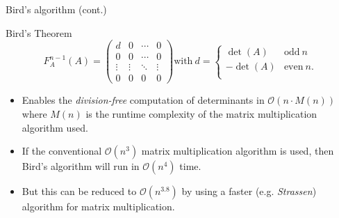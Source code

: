 \documentclass[handout]{beamer}
\begin{document}
\begin{frame}{Bird's algorithm (cont.)}

    \begin{block}{Bird's Theorem}
        \[
            F_A^{n-1}(A) =
            \begin{pmatrix}{}
                d      & 0      & \cdots & 0 \\
                0      & 0      & \cdots & 0 \\
                \vdots & \vdots & \ddots & \vdots \\
                0      & 0      & 0      & 0
            \end{pmatrix}
            \text{with} \ d =
            \begin{cases}{}
                \det(A)  & \text{odd} \ n \\
                -\det(A) & \text{even} \ n. \\
            \end{cases}
        \]
    \end{block}

    \pause{}

    \begin{itemize}

        \item Enables the \emph{division-free} computation of determinants in
            $\mathcal{O}(n\cdot M(n))$ where $M(n)$ is the runtime complexity of the matrix
            multiplication algorithm used.

        \item If the conventional $\mathcal{O}(n^3)$ matrix multiplication algorithm is used,
            then Bird's algorithm will run in $\mathcal{O}(n^4)$ time.

        \item But this can be reduced to $\mathcal{O}(n^{3.8})$ by using a faster
            (e.g. \emph{Strassen}) algorithm for matrix multiplication.

    \end{itemize}

\end{frame}
\end{document}
